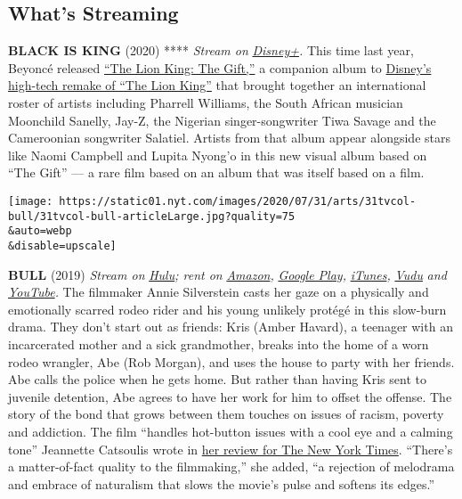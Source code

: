 \hypertarget{whats-streaming}{%
\subsection{What's Streaming}\label{whats-streaming}}

\textbf{BLACK IS KING} (2020) **** \emph{Stream on}
\href{https://www.disneyplus.com/home}{\emph{Disney+}}\emph{.} This time
last year, Beyoncé released
\href{https://www.nytimes.com/2019/07/24/arts/music/beyonce-the-lion-king-the-gift-review.html}{``The
Lion King: The Gift,''} a companion album to
\href{https://www.nytimes.com/2019/07/11/movies/the-lion-king-review.html}{Disney's
high-tech remake of ``The Lion King''} that brought together an
international roster of artists including Pharrell Williams, the South
African musician Moonchild Sanelly, Jay-Z, the Nigerian
singer-songwriter Tiwa Savage and the Cameroonian songwriter Salatiel.
Artists from that album appear alongside stars like Naomi Campbell and
Lupita Nyong'o in this new visual album based on ``The Gift'' --- a rare
film based on an album that was itself based on a film.

\texttt{[image: https://static01.nyt.com/images/2020/07/31/arts/31tvcol-bull/31tvcol-bull-articleLarge.jpg?quality=75\\\&auto=webp\\\&disable=upscale]}

\textbf{BULL} (2019) \emph{Stream on}
\href{https://www.hulu.com/movie/bull-2a7ac784-e2ad-4503-b435-eaa42da82ab8}{\emph{Hulu}}\emph{;
rent on}
\href{https://www.amazon.com/gp/video/detail/amzn1.dv.gti.92b89e94-666b-18d4-a5b5-bcb162dc745b?autoplay=1\&ref_=atv_cf_strg_wb}{\emph{Amazon}}\emph{,}
\href{https://play.google.com/store/movies/details?id=jc9XaqdJufI.P}{\emph{Google
Play}}\emph{,}
\href{https://itunes.apple.com/us/movie/bull/id1503115157}{\emph{iTunes}}\emph{,}
\href{https://www.vudu.com/content/movies/details/Bull/1412867}{\emph{Vudu}}
\emph{and}
\href{https://www.youtube.com/watch?v=ySwIVtwVNPM}{\emph{YouTube}}\emph{.}
The filmmaker Annie Silverstein casts her gaze on a physically and
emotionally scarred rodeo rider and his young unlikely protégé in this
slow-burn drama. They don't start out as friends: Kris (Amber Havard), a
teenager with an incarcerated mother and a sick grandmother, breaks into
the home of a worn rodeo wrangler, Abe (Rob Morgan), and uses the house
to party with her friends. Abe calls the police when he gets home. But
rather than having Kris sent to juvenile detention, Abe agrees to have
her work for him to offset the offense. The story of the bond that grows
between them touches on issues of racism, poverty and addiction. The
film ``handles hot-button issues with a cool eye and a calming tone''
Jeannette Catsoulis wrote in
\href{https://www.nytimes.com/2020/04/30/movies/bull-review.html}{her
review for The New York Times}. ``There's a matter-of-fact quality to
the filmmaking,'' she added, ``a rejection of melodrama and embrace of
naturalism that slows the movie's pulse and softens its edges.''

